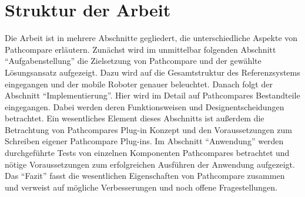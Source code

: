 \section{Struktur der Arbeit}
Die Arbeit ist in mehrere Abschnitte gegliedert, die unterschiedliche Aspekte
von Pathcompare erläutern. Zunächst wird im unmittelbar folgenden Abschnitt
``Aufgabenstellung'' die Zielsetzung von Pathcompare und der gewählte
Lösungsansatz aufgezeigt. Dazu wird auf die Gesamtstruktur des
Referenzsystems eingegangen und der mobile Roboter genauer beleuchtet.  Danach
folgt der Abschnitt ``Implementierung''. Hier wird im Detail auf Pathcompares
Bestandteile eingegangen. Dabei werden deren Funktionsweisen und
Designentscheidungen betrachtet. Ein wesentliches Element dieses Abschnitts ist
außerdem die Betrachtung von Pathcompares Plug-in Konzept und den
Voraussetzungen zum Schreiben eigener Pathcompare Plug-ins. Im Abschnitt
``Anwendung'' werden durchgeführte Tests von einzelnen Komponenten Pathcompares
betrachtet und nötige Voraussetzungen zum erfolgreichen Ausführen der Anwendung
aufgezeigt. Das ``Fazit'' fasst die wesentlichen Eigenschaften von Pathcompare
zusammen und verweist auf mögliche Verbesserungen und noch offene
Fragestellungen.

